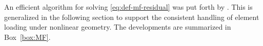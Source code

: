 An efficient algorithm for solving \eqref{eq:def-mf-residual} was put forth by \cite{taylor2003mixed}. 
This is generalized in the following section to support the consistent handling of element loading under nonlinear geometry. The developments are  summarized in Box~\ref{box:MF}. 

%




     
